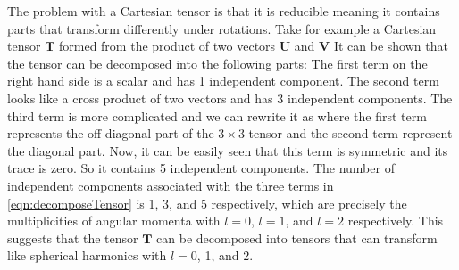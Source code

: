 The problem with a Cartesian tensor is that it is reducible meaning it contains parts that
transform differently under rotations. Take for example a Cartesian tensor $\mathbf{T}$ formed from the product of two vectors $\mathbf{U}$ and $\mathbf{V}$ 
It can be shown that the tensor can be decomposed into the following parts:
The first term on the right hand side is a scalar and has 1 independent component. The second term looks like a 
cross product of two vectors  and has 3  independent components. The third term is more complicated and we can
rewrite it as
where the first term represents the off-diagonal part of the $3\times 3$ tensor and the second term represent the 
diagonal part. Now,  it can be easily seen that this term is symmetric and its trace is zero. So it contains
5 independent components. The number of independent components associated with the three terms in \autoref{eqn:decomposeTensor} is 1, 3, and 5 respectively, which are precisely the multiplicities of angular momenta
with $l=0$, $l=1$, and $l=2$ respectively. This suggests that the tensor $\mathbf{T}$ can be decomposed into tensors
that can transform like spherical harmonics with $l=0$, 1, and 2. 

